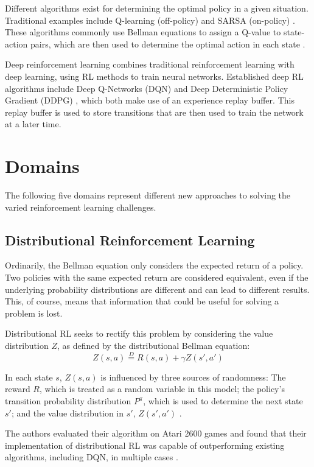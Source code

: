 \documentclass[runningheads]{llncs}
\begin{document}
Different algorithms exist for determining the optimal policy in a given situation. Traditional examples include Q-learning (off-policy) and SARSA (on-policy) \cite{sutton2018reinforcement,watkins1992q}. These algorithms commonly use Bellman equations to assign a Q-value to state-action pairs, which are then used to determine the optimal action in each state \cite{sutton2018reinforcement}.

Deep reinforcement learning combines traditional reinforcement learning with deep learning, using RL methods to train neural networks. Established deep RL algorithms include Deep Q-Networks (DQN) \cite{mnih2013playing} and Deep Deterministic Policy Gradient (DDPG) \cite{lillicrap2015continuous}, which both make use of an experience replay buffer. This replay buffer is used to store transitions that are then used to train the network at a later time.

\section{Domains}

The following five domains represent different new approaches to solving the varied reinforcement learning challenges.

\subsection{Distributional Reinforcement Learning}

Ordinarily, the Bellman equation only considers the expected return of a policy. Two policies with the same expected return are considered equivalent, even if the underlying probability distributions are different and can lead to different results. This, of course, means that information that could be useful for solving a problem is lost.

Distributional RL \cite{bellemare2017distributional} seeks to rectify this problem by considering the value distribution $Z$, as defined by the distributional Bellman equation: $$Z(s,a) \overset{D}{=} R(s,a) + \gamma Z(s',a')$$

In each state $s$, $Z(s,a)$ is influenced by three sources of randomness: The reward $R$, which is treated as a random variable in this model; the policy's transition probability distribution $P^\pi$, which is used to determine the next state $s'$; and the value distribution in $s'$, $Z(s',a')$ \cite{bellemare2017distributional}.

The authors evaluated their algorithm on Atari 2600 games and found that their implementation of distributional RL was capable of outperforming existing algorithms, including DQN, in multiple cases \cite{bellemare2017distributional}.
\end{document}
